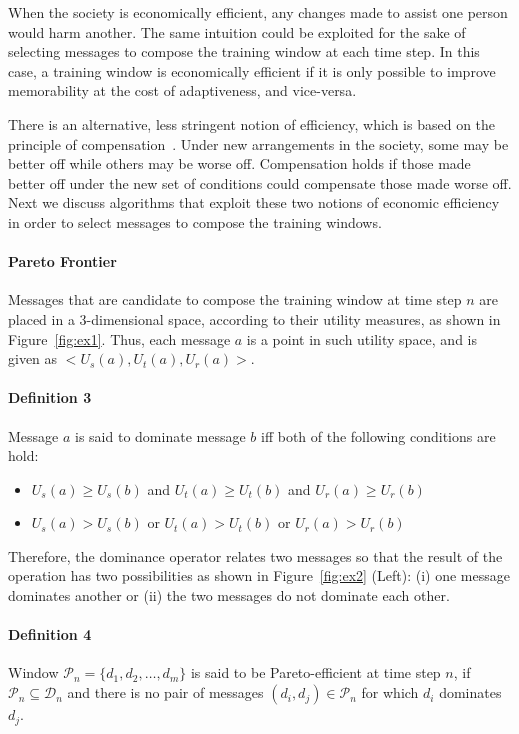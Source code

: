 When the society is economically efficient, any changes made to assist one person would harm another. The same intuition could be exploited for the sake of selecting messages to compose the training window at each time step. In this case, a training window is economically efficient if it is only possible to improve memorability at the cost of adaptiveness, and vice-versa.



There is an alternative, less stringent notion of efficiency, which is based on the principle of compensation~\cite{compensation}.
Under new arrangements in the society, some may be better off while others may be worse off.
Compensation holds if those made better off
under the new set of conditions could compensate those made worse off. Next we discuss algorithms that exploit these two notions of economic efficiency in order to select messages to compose the training windows.



\paragraph*{\bf{Pareto Frontier}}
Messages that are candidate to compose the training window at time step $n$ are placed in a 3-dimensional space, according to their utility measures, as shown in Figure~\ref{fig:ex1}.
Thus, each message $a$ is a point in such utility space, and is given as $<U_s(a),U_t(a),U_r(a)>$.

\paragraph*{\bf{Definition 3}} Message $a$ is said to dominate message $b$ iff both of the following conditions are hold:
\begin{itemize}
\item $U_s(a)\ge U_s(b)$ and $U_t(a)\ge U_t(b)$ and $U_r(a)\ge U_r(b)$
\item $U_s(a) > U_s(b)$ or $U_t(a) > U_t(b)$ or $U_r(a) > U_r(b)$
\end{itemize}
Therefore, the dominance operator relates two messages so that the result of the
operation has two possibilities as shown in Figure~\ref{fig:ex2} (Left): (i) one message dominates another or (ii) the two
messages do not dominate each other.

\paragraph*{\bf{Definition 4}} Window $\mathcal{P}_n=\{d_1, d_2, \ldots, d_m\}$ is said to be Pareto-efficient at time step $n$, if $\mathcal{P}_n\subseteq\mathcal{D}_n$ and there is no pair of messages $(d_i, d_j)\in\mathcal{P}_n$ for which $d_i$ dominates $d_j$.\\

